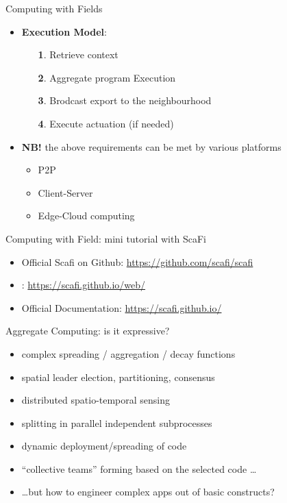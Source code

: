 \documentclass[8pt, aspectratio=169, handout]{beamer}
\begin{document}
\begin{frame}{Computing with Fields}
\begin{card}
\begin{itemize}
\begin{itemize}
    \end{itemize}
    \item \textbf{Execution Model}:
    \begin{enumerate}
      \item[\textbf{1}.] Retrieve context
      \item[\textbf{2}.] Aggregate program Execution
      \item[\textbf{3}.] Brodcast export to the neighbourhood
      \item[\textbf{4}.] Execute actuation (if needed)
    \end{enumerate}
    \item \textbf{NB!} the above requirements can be met by various platforms
    \begin{itemize}
      \item P2P
      \item Client-Server
      \item Edge-Cloud computing
    \end{itemize}
  \end{itemize}
\end{card}
\end{frame}
\begin{frame}{Computing with Field: mini tutorial with ScaFi}
  \begin{card}[References]
    \begin{itemize}
    \item Official Scafi on Github: \url{https://github.com/scafi/scafi}
    \item {}: \url{https://scafi.github.io/web/}
    \item Official Documentation: \url{https://scafi.github.io/}
    \end{itemize}
  \end{card}
  \centering
\end{frame}
\begin{frame}{Aggregate Computing: is it expressive?}
  \begin{card}
    \begin{itemize}
      \item complex spreading / aggregation / decay functions
      \item spatial leader election, partitioning, consensus
      \item distributed spatio-temporal sensing 
      \item splitting in parallel independent subprocesses
      \item dynamic deployment/spreading of code
      \item ``collective teams'' forming based on the selected code \dots
      \item \dots but how to engineer complex apps out of basic constructs?
    \end{itemize}
  \end{card}
\end{frame}
\end{document}
